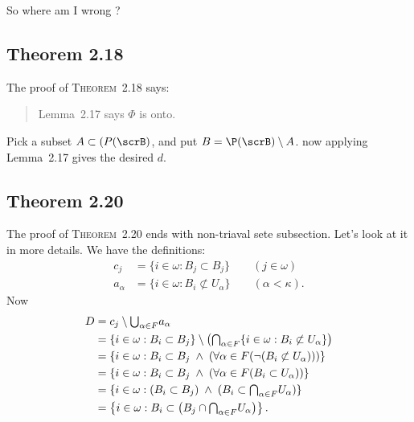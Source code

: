 So where am I wrong ?

\subsection{Theorem 2.18}

The proof of \textsc{Theorem}~2.18 says:
\begin{quote}
Lemma~2.17 says \(\Phi\) is onto.
\end{quote}
Pick a subset \(A\subset(P(\scrB)\), and put \(B=\P(\scrB)\setminus A\).
now applying Lemma~2.17 gives the desired $d$.

\subsection{Theorem 2.20}

The proof of \textsc{Theorem}~2.20 ends
with non-triaval sete subsection.
Let's look at it in more details.
We have the definitions:
\begin{align*}
c_j &= \{i\in\omega: B_j \subset B_j\} \qquad(j\in\omega) \\
a_\alpha &= \{i\in\omega: B_i \not\subset U_\alpha\} \qquad(\alpha<\kappa).
\end{align*}
Now
\begin{align*}
D &= c_j \setminus \mathsmaller{\bigcup_{\alpha\in F}} a_\alpha \\
  &= \{i\in\omega: B_i \subset B_j\}
    \setminus
    \left(\mathsmaller{\bigcap_{\alpha\in F}} 
      \{i\in\omega: B_i \not\subset U_\alpha\}\right)  \\
  &= \{i\in\omega: B_i \subset B_j\;\land\;
       \left(\forall \alpha\in F (\lnot (B_i \not\subset U_\alpha))\right)\} \\
  &= \{i\in\omega: B_i \subset B_j\;\land\;
       \left(\forall \alpha\in F (B_i \subset U_\alpha)\right)\} \\
  &= \{i\in\omega: (B_i \subset B_j)\;\land\;
       (B_i \subset \mathsmaller{\bigcap_{\alpha\in F}} U_\alpha)\} \\
  &= \left\{i\in\omega: B_i \subset 
    \left(B_j\cap\mathsmaller{\bigcap_{\alpha\in F}} U_\alpha\right)\right\}.
\end{align*}

